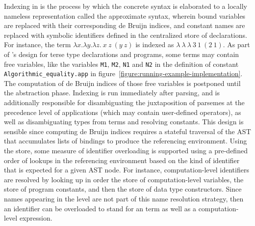 Indexing in \Beluga is the process by which the concrete syntax is elaborated to a locally nameless representation called the approximate syntax, wherein bound variables are replaced with their corresponding de Bruijn indices, and constant names are replaced with symbolic identifiers defined in the centralized store of declarations.
For instance, the \LF term $\lambda x. \lambda y. \lambda z.\ x\ z\ (y\ z)$ is indexed as $\lambda\ \lambda\ \lambda\ 3\ 1\ (2\ 1)$.
As part of \Beluga's design for terse type declarations and programs, some terms may contain free variables, like the variables \verb|M1|, \verb|M2|, \verb|N1| and \verb|N2| in the definition of constant \verb|Algorithmic_equality.app| in figure~\ref{figure:running-example-implementation}.
The computation of de Bruijn indices of those free variables is postponed until the abstraction phase.
Indexing is run immediately after parsing, and is additionally responsible for disambiguating the juxtaposition of \LF parsemes at the precedence level of applications (which may contain user-defined operators), as well as disambiguating \LF types from terms and resolving constants.
This design is sensible since computing de Bruijn indices requires a stateful traversal of the \ac{AST} that accumulates lists of bindings to produce the referencing environment.
Using the store, some measure of identifier overloading is supported using a pre-defined order of lookups in the referencing environment based on the kind of identifier that is expected for a given \ac{AST} node.
For instance, computation-level identifiers are resolved by looking up in order the store of computation-level variables, the store of program constants, and then the store of data type constructors.
Since names appearing in the \LF level are not part of this name resolution strategy, then an identifier can be overloaded to stand for an \LF term as well as a computation-level expression.

